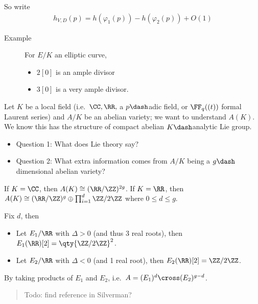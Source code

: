 So write
\begin{align*}
h_{V, D}(p) = h(\varphi_1(p)) - h(\varphi_2(p)) + O(1)
\end{align*}

\begin{description}
\item[Example]
For \(E/K\) an elliptic curve,

\begin{itemize}
\tightlist
\item
  \(2[0]\) is an ample divisor
\item
  \(3[0]\) is a very ample divisor.
\end{itemize}
\end{description}

Let \(K\) be a local field (i.e.~\(\CC, \RR,\) a \(p\dash\)adic field,
or \(\FF_q((t))\) formal Laurent series) and \(A/K\) be an abelian
variety; we want to understand \(A(K)\). We know this has the structure
of compact abelian \(K\dash\)analytic Lie group.

\begin{itemize}
\item
  Question 1: What does Lie theory say?
\item
  Question 2: What extra information comes from \(A/K\) being a
  \(g\dash\)dimensional abelian variety?
\end{itemize}

If \(K = \CC\), then \(A(K) \cong (\RR/\ZZ)^{2g}\). If \(K = \RR\), then
\(A(K) \cong (\RR/\ZZ)^g \oplus \prod_{i=1}^d \ZZ/2\ZZ\) where
\(0\leq d \leq g\).

Fix \(d\), then

\begin{itemize}
\item
  Let \(E_1/\RR\) with \(\Delta > 0\) (and thus 3 real roots), then
  \(E_1(\RR)[2] = \qty{\ZZ/2\ZZ}^2\).
\item
  Let \(E_2/\RR\) with \(\Delta < 0\) (and 1 real root), then
  \(E_2(\RR)[2] = \ZZ/2\ZZ\).
\end{itemize}

By taking products of \(E_1\) and \(E_2\),
i.e.~\(A =(E_1)^{d} \cross (E_2)^{g-d}\).

\begin{quote}
Todo: find reference in Silverman?
\end{quote}

